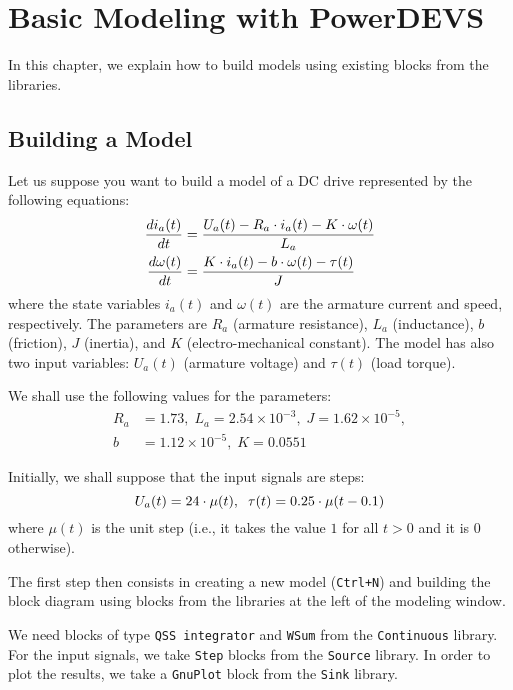 \chapter{Basic Modeling with PowerDEVS}
In this chapter, we explain how to build models using existing blocks from the libraries.

\section{Building a Model}
Let us suppose you want to build a model of a DC drive represented by the following equations:
\begin{equation}\label{eq:motor}
  \begin{split}
   \frac{\displaystyle di_a(t)}{\displaystyle dt}&=\frac{U_a(t)-R_a\cdot i_a(t)-K\cdot \omega(t)}{L_a}\\
   \frac{\displaystyle d\omega(t)}{\displaystyle dt}&=\frac{K\cdot i_a(t)-b\cdot \omega(t)-\tau(t)}{J}\\
  \end{split}
\end{equation}
where the state variables $i_a(t)$ and $\omega(t)$ are the armature current and speed, respectively. The parameters are $R_a$ (armature resistance), $L_a$ (inductance), $b$ (friction), $J$ (inertia), and $K$ (electro-mechanical constant). The model has also two input variables: $U_a(t)$ (armature voltage) and $\tau(t)$ (load torque).

We shall use the following values for the parameters:
\begin{equation}\label{eq:motor_pars}
\begin{split}
 R_a&=1.73,\;L_a=2.54\times 10^{-3},\;J=1.62\times 10^{-5},\\
b&=1.12\times 10^{-5},\;K=0.0551 
\end{split}
\end{equation}

Initially, we shall suppose that the input signals are steps:
\begin{equation}
 U_a(t)=24\cdot \mu(t),\;\;\tau(t)=0.25\cdot \mu(t-0.1)
\end{equation}
where $\mu(t)$ is the unit step (i.e., it takes the value $1$ for all $t>0$ and it is $0$ otherwise).

The first step then consists in creating a new model (\verb"Ctrl+N") and building the block diagram using blocks from the libraries at the left of the modeling window.

We need blocks of type \verb"QSS integrator" and \verb"WSum" from the \verb"Continuous" library. For the input signals, we take \verb"Step" blocks from the \verb"Source" library. In order to plot the results, we take a \verb"GnuPlot" block from the \verb"Sink" library.

